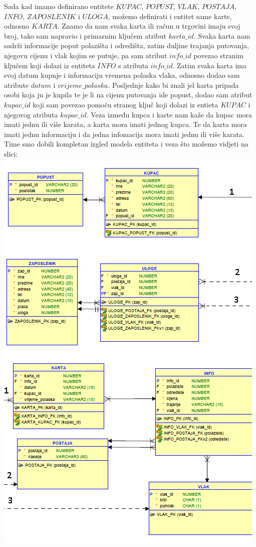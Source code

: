 \documentclass{OM_style}
\begin{document}
Sada kad imamo definirano entitete $KUPAC$, $POPUST$, $VLAK$, $POSTAJA$, $INFO$, $ZAPOSLENIK$ i $ULOGA$, možemo definirati i entitet same karte, odnosno $KARTA$. Znamo da nam svaka karta ili račun u trgovini imaju svoj broj, tako sam napravio i primarnim ključem atribut $karta\_id$. Svaka karta nam sadrži informacije poput polazišta i odredišta, zatim duljine trajanja putovanja, njegovu cijenu i vlak kojim se putuje, pa sam atribut $info\_id$ povezao stranim ključem koji dolazi iz entiteta $INFO$ s atributa $info\_id$. Zatim svaka karta ima svoj datum kupnje i informaciju vremena polaska vlaka, odnosno dodao sam atribute $datum$ i $vrijeme\_polaska$. Posljednje kako bi znali jel karta pripada osobi koja ju je kupila te je li na cijenu putovanja ide popust, dodao sam atribut $kupac\_id$ koji sam povezao pomoću stranog ključ koji dolazi iz entieta $KUPAC$ i njegovog atributa $kupac\_id$. Veza između kupca i karte nam kaže da kupac mora imati jednu ili više karata, a karta mora imati jednog kupca. Te da karta mora imati jednu informaciju i da jedna infomacija mora imati jednu ili više karata. Time smo dobili kompletan izgled modela entiteta i veza što možemo vidjeti na slici: \\

\phantom{............} \includegraphics{fullmev} \\
\end{document}

